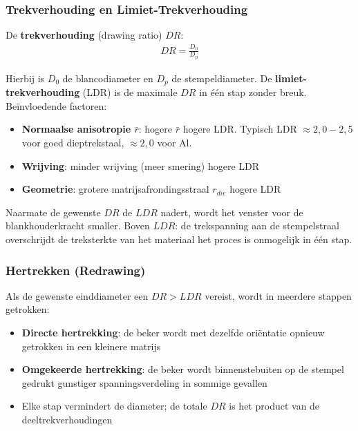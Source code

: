 \subsubsection{Trekverhouding en Limiet-Trekverhouding}

De \textbf{trekverhouding} (drawing ratio) $DR$:
\begin{align*}
    DR = \frac{D_0}{D_p}
\end{align*}

Hierbij is $D_0$ de blancodiameter en $D_p$ de stempeldiameter. De \textbf{limiet-trekverhouding} (LDR) is de maximale $DR$ in één stap zonder breuk. Beïnvloedende factoren:
\begin{itemize}
    \item \textbf{Normaalse anisotropie $\bar{r}$}: hogere $\bar{r}$ \textrightarrow{} hogere LDR. Typisch LDR $\approx 2{,}0 - 2{,}5$ voor goed dieptrekstaal, $\approx 2{,}0$ voor Al.
    \item \textbf{Wrijving}: minder wrijving (meer smering) \textrightarrow{} hogere LDR
    \item \textbf{Geometrie}: grotere matrijsafrondingsstraal $r_{die}$ \textrightarrow{} hogere LDR
\end{itemize}

\begin{warningbox}
Naarmate de gewenste $DR$ de $LDR$ nadert, wordt het venster voor de blankhouderkracht smaller. Boven $LDR$: de trekspanning aan de stempelstraal overschrijdt de treksterkte van het materiaal \textrightarrow{} het proces is onmogelijk in één stap.
\end{warningbox}

\subsubsection{Hertrekken (Redrawing)}

Als de gewenste einddiameter een $DR > LDR$ vereist, wordt in meerdere stappen getrokken:
\begin{itemize}
    \item \textbf{Directe hertrekking}: de beker wordt met dezelfde oriëntatie opnieuw getrokken in een kleinere matrijs
    \item \textbf{Omgekeerde hertrekking}: de beker wordt binnenstebuiten op de stempel gedrukt \textrightarrow{} gunstiger spanningsverdeling in sommige gevallen
    \item Elke stap vermindert de diameter; de totale $DR$ is het product van de deeltrekverhoudingen
\end{itemize}

